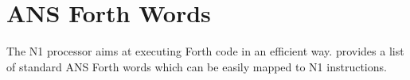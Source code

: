 
\section{ANS Forth Words}
\label{N1_words}

The N1 processor aims at executing Forth code in an efficient way.
 provides a list of standard ANS Forth\cite{dpans94} words 
which can be easily mapped to N1 instructions. 

